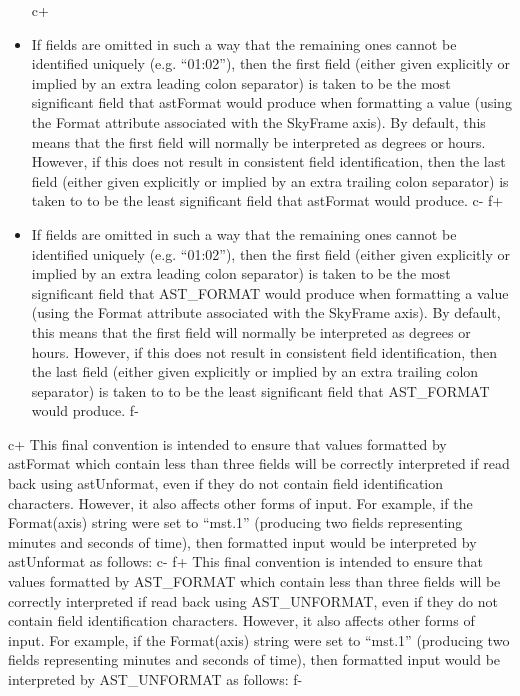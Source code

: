 \documentclass[twoside,11pt]{article}
\begin{document}
\begin{itemize}
c+
\item If fields are omitted in such a way that the remaining ones
cannot be identified uniquely (e.g. ``01:02''), then the first field
(either given explicitly or implied by an extra leading colon
separator) is taken to be the most significant field that astFormat
would produce when formatting a value (using the Format attribute
associated with the SkyFrame axis). By default, this means that the
first field will normally be interpreted as degrees or hours. However,
if this does not result in consistent field identification, then the
last field (either given explicitly or implied by an extra trailing
colon separator) is taken to to be the least significant field that
astFormat would produce.
c-
f+
\item If fields are omitted in such a way that the remaining ones
cannot be identified uniquely (e.g. ``01:02''), then the first field
(either given explicitly or implied by an extra leading colon
separator) is taken to be the most significant field that AST\_FORMAT
would produce when formatting a value (using the Format attribute
associated with the SkyFrame axis). By default, this means that the
first field will normally be interpreted as degrees or hours. However,
if this does not result in consistent field identification, then the
last field (either given explicitly or implied by an extra trailing
colon separator) is taken to to be the least significant field that
AST\_FORMAT would produce.
f-

\end{itemize}

c+
This final convention is intended to ensure that values formatted by
astFormat which contain less than three fields will be correctly
interpreted if read back using astUnformat, even if they do not
contain field identification characters.  However, it also affects
other forms of input. For example, if the Format(axis) string were set
to ``mst.1'' (producing two fields representing minutes and seconds of
time), then formatted input would be interpreted by astUnformat as
follows:
c-
f+
This final convention is intended to ensure that values formatted by
AST\_FORMAT which contain less than three fields will be correctly
interpreted if read back using AST\_UNFORMAT, even if they do not
contain field identification characters.  However, it also affects
other forms of input. For example, if the Format(axis) string were set
to ``mst.1'' (producing two fields representing minutes and seconds of
time), then formatted input would be interpreted by AST\_UNFORMAT as
follows:
f-
\end{document}
